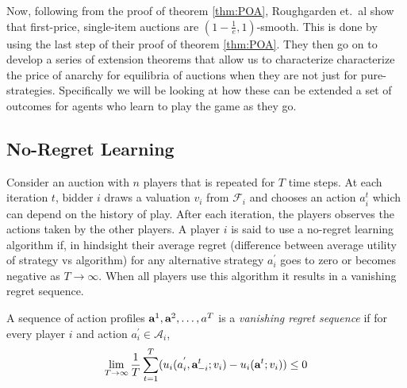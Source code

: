 \documentclass[12pt,twoside]{reedthesis}
\begin{document}
 Now, following from the proof of theorem \ref{thm:POA}, Roughgarden et.~al show that first-price, single-item auctions are $(1-\frac{1}{e}, 1)$-smooth. This is done by using the last step of their proof of theorem \ref{thm:POA}. They then go on to develop a series of extension theorems that allow us to characterize characterize the price of anarchy for equilibria of auctions when they are not just for pure-strategies. Specifically we will be looking at how these can be extended a set of outcomes for agents who learn to play the game as they go.





\subsection{No-Regret Learning}
Consider an auction with $n$ players that is repeated for $T$ time steps. At each iteration $t$, bidder $i$ draws a valuation $v_i$ from $\mathcal{F}_i$ and chooses an action $a_i^t$ which can depend on the history of play. After each iteration, the players observes the actions taken by the other players. 
A player $i$ is said to use a no-regret learning algorithm if, in hindsight their average regret (difference between average utility of strategy vs algorithm) for any alternative strategy $a_i^{'}$ goes to zero or becomes negative as $T \rightarrow \infty$. When all players use this algorithm it results in a vanishing regret sequence.

\begin{dfn}
	A sequence of action profiles $\textbf{a}^1 , \textbf{a}^2, \ldots, a^T$ is a \textit{vanishing regret sequence} if for every player $i$ and action $a_i^{'} \in \mathcal{A}_i$,
	$$ \lim\limits_{T \rightarrow \infty} \frac{1}{T} \sum_{t=1}^{T}(u_i(a_i^{'}, \textbf{a}_{-i}^{t};v_i) - u_i(\textbf{a}^t; v_i)) \leq 0$$
	\label{dfn:noregret} 
\end{dfn}
\end{document}
